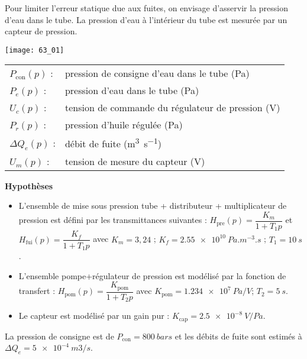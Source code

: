 \normalfalse \difficiletrue \tdifficilefalse
\correctiontrue

\setcounter{question}{0}

\ifcorrection
\else
{}
\fi

\ifprof
\else

Pour limiter l’erreur statique due aux fuites, on envisage d’asservir la pression d’eau dans le tube. 
La pression d’eau à l’intérieur du tube est mesurée par un capteur de pression. 

\begin{center}
\texttt{[image: 63\_01]}
\end{center}

 
 \begin{tabular}{lp{5cm}}
$P_{\text{con}}(p)$ : & 	pression de consigne d’eau dans le tube (Pa) \\
$P_e(p)$ : & 	pression d’eau dans le tube (Pa) \\
$U_c(p)$ : & 	tension de commande du régulateur de pression (V)\\
$P_r(p)$ : &	pression d’huile régulée (Pa)\\
$\Delta Q_e(p)$ :& 	débit de fuite (\si{m^3s^{-1}})\\
$U_m(p)$ 	:&	tension de mesure du capteur (V)\\
\end{tabular}
 
\textbf{ Hypothèses}
\begin{itemize}
\item L’ensemble de mise sous pression {tube + distributeur + multiplicateur de pression} est défini par les transmittances suivantes : $H_{\text{pre}} (p)=\dfrac{K_m}{1+T_1 p}$	et	$H_{\text{fui}} (p)=\dfrac{K_f}{1+T_1 p}$ avec 	$K_m = 3,24$ ; 	$K_f = \SI{2,55e10}{Pa.m^{-3}.s}$ ; 	$T_1  = \SI{10}{s}$.
\item L’ensemble {pompe+régulateur de pression} est modélisé par la fonction de transfert :
$H_{\text{pom}} (p)=\dfrac{K_{\text{pom}}}{1+T_2 p}$  avec 	$K_{\text{pom}} = \SI{1,234e7}{Pa/V}$; 	$T_2 = \SI{5}{s}$.
\item Le capteur est modélisé par un gain pur :	$K_{\text{cap}} = \SI{2,5e-8}{V/Pa}$.
\end{itemize}
La pression de consigne est de $P_{\text{con}} = \SI{800}{bars}$ et les débits de fuite sont estimés à $\Delta Q_e = \SI{5e-4}{m3/s}$.

